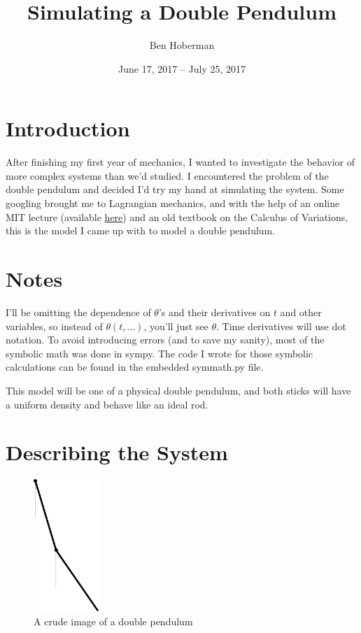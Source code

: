 \documentclass[]{article}
\title{Simulating a Double Pendulum}
\author{Ben Hoberman}
\begin{document}
	
\date{June 17, 2017 -- July 25, 2017}
\maketitle

\newcommand{\lagr}{\mathcal{L}}

\section{Introduction}

After finishing my first year of mechanics, I wanted to investigate the behavior of more complex systems than we'd studied. I encountered the problem of the double pendulum and decided I'd try my hand at simulating the system. Some googling brought me to Lagrangian mechanics, and with the help of an online MIT lecture (available \href{https://www.youtube.com/watch?v=zhk9xLjrmi4&t=3925s}{here}) and an old textbook on the Calculus of Variations, this is the model I came up with to model a double pendulum.

\section{Notes}

I'll be omitting the dependence of $\theta$'s and their derivatives on $t$ and other variables, so instead of $\theta{(t, ...)}$, you'll just see $\theta$. Time derivatives will use dot notation. To avoid introducing errors (and to save my sanity), most of the symbolic math was done in sympy. The code I wrote for those symbolic calculations can be found in the embedded symmath.py file.

This model will be one of a physical double pendulum, and both sticks will have a uniform density and behave like an ideal rod.

\section{Describing the System}
\begin{figure}[h!]
	\includegraphics[height=5cm]{situation}
	\caption{A crude image of a double pendulum}
\end{figure}
\end{document}
